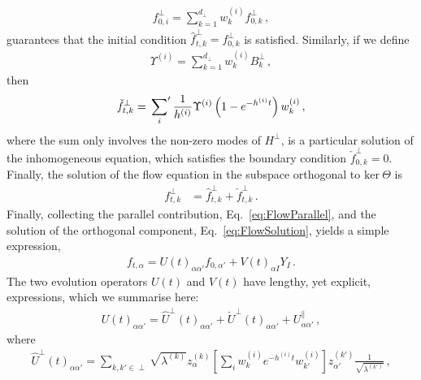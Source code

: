 \begin{align}
    \label{eq:InitialCi}
    f^{\perp}_{0,i} = \sum_{k=1}^{d_\perp} w^{(i)}_k f^\perp_{0,k}\, ,
\end{align}
guarantees that the initial condition $\hat{f}^\perp_{t,k}=f^\perp_{0,k}$ is
satisfied. Similarly, if we define
\begin{align}
    \label{eq:BiDef}
    \Upsilon^{(i)} = \sum_{k=1}^{d_\perp} w^{(i)}_k B^\perp_{k}\, ,
\end{align}
then
\begin{align}
    \label{eq:PartSol}
    \check{f}^\perp_{t,k} = \sideset{}{'}\sum_{i} \frac{1}{h^{(i)}} \Upsilon^{(i)}
        \left(1 - e^{-h^{(i)}t}\right) w^{(i)}_k\, ,
\end{align}
where the sum only involves the non-zero modes of $H^\perp$, is a particular
solution of the inhomogeneous equation, which satisfies the boundary condition
$\check{f}^{\perp}_{0,k}=0$. Finally, the solution of the flow equation in the
subspace orthogonal to $\text{ker}\ \Theta$ is
\begin{align}
    f^\perp_{t,k}
    \label{eq:FlowSolution}
        &= \hat{f}^\perp_{t,k} + \check{f}^\perp_{t,k}
        \, .
\end{align}
Finally, collecting the parallel contribution, Eq.~\eqref{eq:FlowParallel}, and
the solution of the orthogonal component, Eq.~\eqref{eq:FlowSolution}, yields a
simple expression,
\begin{align}
    \label{eq:AnalyticSol}
    f_{t,\alpha}
        = U(t)_{\alpha\alpha'} f_{0,\alpha'} + V(t)_{\alpha I} Y_{I}\, .
\end{align}
The two evolution operators $U(t)$ and $V(t)$ have lengthy, yet explicit,
expressions, which we summarise here: 
\begin{align}
    U(t)_{\alpha\alpha'} = \hat{U}^\perp(t)_{\alpha\alpha'}
        + \check{U}^\perp(t)_{\alpha\alpha'} + U^\parallel_{\alpha\alpha'}\, ,
\end{align}
where
\begin{align}
    \hat{U}^\perp(t)_{\alpha\alpha'}
        = \sum_{k,k'\in\perp} \sqrt{\lambda^{(k)}} z^{(k)}_\alpha 
            \left[\sum_i w^{(i)}_{k} e^{-h^{(i)}t} w^{(i)}_{k'}\right]
            z^{(k')}_{\alpha'} \frac{1}{\sqrt{\lambda^{(k')}}}\, ,
\end{align}
